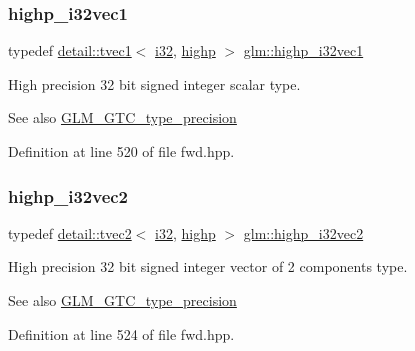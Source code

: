 \subsubsection{\texorpdfstring{highp\+\_\+i32vec1}{highp\_i32vec1}}
{\footnotesize\ttfamily typedef \hyperlink{structglm_1_1detail_1_1tvec1}{detail\+::tvec1}$<$ \hyperlink{group__gtc__type__precision_ga1d8ed5c43e91ea7d4528389da4fa9524}{i32}, \hyperlink{namespaceglm_a0f04f086094c747d227af4425893f545ac6f7eab42eacbb10d59a58e95e362074}{highp} $>$ \hyperlink{group__gtc__type__precision_gadcd58130a48fa561e784a135a88c5d6e}{glm\+::highp\+\_\+i32vec1}}

High precision 32 bit signed integer scalar type. \begin{DoxySeeAlso}{See also}
\hyperlink{group__gtc__type__precision}{G\+L\+M\+\_\+\+G\+T\+C\+\_\+type\+\_\+precision} 
\end{DoxySeeAlso}


Definition at line 520 of file fwd.\+hpp.

\mbox{\label{group__gtc__type__precision_ga6020d795076243085eb0d6826c849b4a}} 
\subsubsection{\texorpdfstring{highp\+\_\+i32vec2}{highp\_i32vec2}}
{\footnotesize\ttfamily typedef \hyperlink{structglm_1_1detail_1_1tvec2}{detail\+::tvec2}$<$ \hyperlink{group__gtc__type__precision_ga1d8ed5c43e91ea7d4528389da4fa9524}{i32}, \hyperlink{namespaceglm_a0f04f086094c747d227af4425893f545ac6f7eab42eacbb10d59a58e95e362074}{highp} $>$ \hyperlink{group__gtc__type__precision_ga6020d795076243085eb0d6826c849b4a}{glm\+::highp\+\_\+i32vec2}}

High precision 32 bit signed integer vector of 2 components type. \begin{DoxySeeAlso}{See also}
\hyperlink{group__gtc__type__precision}{G\+L\+M\+\_\+\+G\+T\+C\+\_\+type\+\_\+precision} 
\end{DoxySeeAlso}


Definition at line 524 of file fwd.\+hpp.

\mbox{\label{group__gtc__type__precision_ga95de80f73e676fb6b9976ff0d33bbc4b}} 
